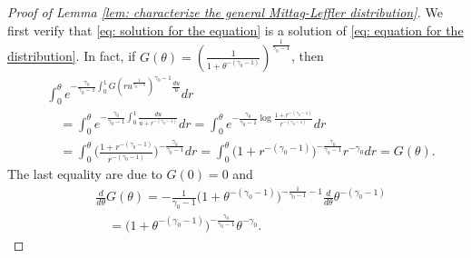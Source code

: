\documentclass[12pt, a4paper]{amsart}
\theoremstyle{definition}
\numberwithin{equation}{section}
\begin{document}
\begin{proof}[Proof of Lemma \ref{lem: characterize the general Mittag-Leffler distribution}]
	
	We first verify that \eqref{eq: solution for the equation}  is a solution of \eqref{eq: equation for the distribution}.
	In fact, if $G(\theta) = (\frac{1}{1+ \theta^{-(\gamma_0 - 1)}})^{\frac{1}{\gamma_0 - 1}}$, then
\[\begin{split}
	& \int_0^\theta e^{- \frac{\gamma_0} {\gamma_0 - 1} \int_0^1 G(ru^{\frac{1}{\gamma_0 - 1}})^{\gamma_0 - 1}\frac{du}{u}} dr
	\\&\quad = \int_0^\theta e^{- \frac{\gamma_0} {\gamma_0 - 1} \int_0^1 \frac{du}{u+r^{-(\gamma_0 - 1)}} } dr
	= \int_0^\theta e^{- \frac{\gamma_0} {\gamma_0 - 1} \log\frac{1+r^{-(\gamma_0 - 1)}}{r^{-(\gamma_0 - 1)} } } dr
	\\&\quad = \int_0^\theta \big(\frac{1+r^{-(\gamma_0 - 1)}}{r^{-(\gamma_0 - 1)} }\big)^{- \frac{\gamma_0} {\gamma_0 - 1}} dr
	= \int_0^\theta \big( 1 + r^{ - ( \gamma_0 - 1 ) } \big)^{- \frac{\gamma_0} {\gamma_0 - 1}} r^{-\gamma_0} dr
	= G(\theta).
\end{split}\]
	The last equality are due to $G(0) = 0$ and 
\[\begin{split}
	&\frac{d}{d\theta}G(\theta) 
	= - \frac{1}{\gamma_0 - 1} \big(1+\theta^{-(\gamma_0 - 1)}\big)^{- \frac{1}{\gamma_0 - 1} - 1} \frac{d}{d\theta} \theta^{-(\gamma_0 - 1)}
	\\&\quad =  \big(1+\theta^{-(\gamma_0 - 1)}\big)^{- \frac{\gamma_0}{\gamma_0 - 1} } \theta^{-\gamma_0}.
\end{split}\]
	

\end{proof}
\end{document}
